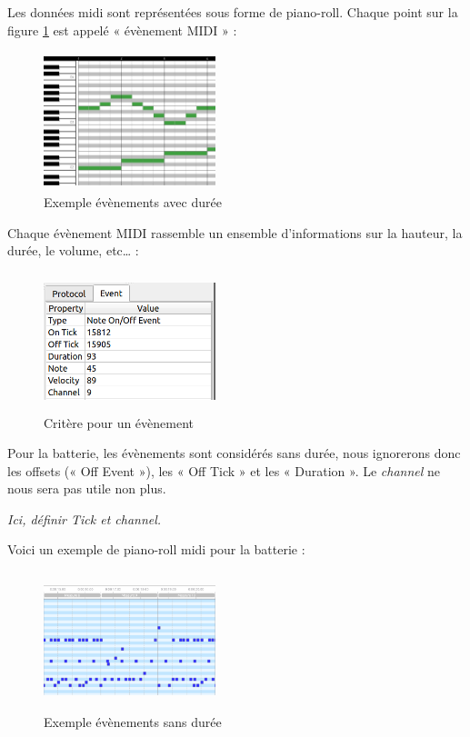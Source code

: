 Les données midi sont représentées sous forme de piano-roll. 
%
Chaque point sur la figure \ref{piano_roll} est appelé « évènement MIDI » :
\begin{figure}[!h]
	\centering
	\includegraphics[height=40mm, width=50mm]{z_images/1_contexte/2_midi_piano.jpg}
	\caption{Exemple évènements avec durée}
	\label{piano_roll}
\end{figure}

Chaque évènement MIDI rassemble un ensemble d’informations sur la hauteur, la durée, le volume, etc… :
\begin{figure}[h!]
	\centering
	\includegraphics[height=40mm, width=50mm]{z_images/1_contexte/3_evenements_midi.png}
	\caption{Critère pour un évènement}
\end{figure} %
{}

Pour la batterie, les évènements sont considérés sans durée, nous ignorerons donc les offsets (« Off Event »), les « Off Tick » et les « Duration ». 
Le \textit{channel} ne nous sera pas utile non plus.

\textit{Ici, définir Tick et channel.}

Voici un exemple de piano-roll midi pour la batterie :
\begin{figure}[h!]
	\centering
	\includegraphics[height=40mm, width=50mm]{z_images/1_contexte/4_midi_batterie.png}
	\caption{Exemple évènements sans durée}
\end{figure}

